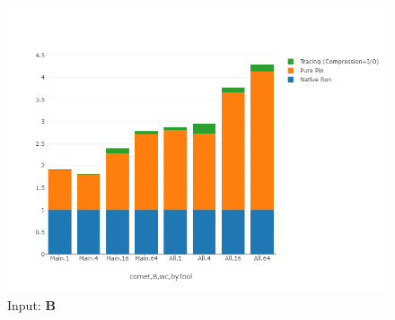 






















\begin{figure}[!t]
\centering
\includegraphics[width=6in]{figs.comet/comet_chartDet_B_wc_byTool_p3_5.png}
\caption{ Input: \textbf{B}
}
\label{comet_chartDet_B_wc_byTool_p3_5}
\end{figure}


